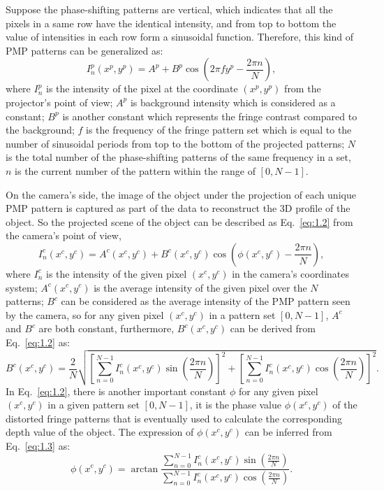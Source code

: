 \documentclass[]{spie}  %
\begin{document}
Suppose the phase-shifting patterns are vertical, which indicates that all the pixels in a same row have the identical intensity, and from top to bottom the value of intensities in each row form a sinusoidal function. Therefore, this kind of PMP patterns can be generalized as:
 \begin{equation} \label{eq:1.1}
  	I^p_n(x^p, y^p) = A^p + B^p\cos\left(2\pi f y^p - \frac{2\pi n}{N}\right),
  \end{equation}
where $I^p_n$ is the intensity of the pixel at the coordinate $(x^p, y^p)$ from the projector's point of view; $A^p$ is background intensity which is considered as a constant; $B^p$ is another constant which represents the fringe contrast compared to the background; $f$ is the frequency of the fringe pattern set which is equal to the number of sinusoidal periods from top to the bottom of the projected patterns; $N$ is the total number of the phase-shifting patterns of the same frequency in a set, $n$ is the current number of the pattern within the range of $[0, N-1]$.

On the camera's side, the image of  the object under the projection of each unique PMP pattern is captured as part of the data to reconstruct the 3D profile of the object. So the projected scene of the object can be described as Eq.~\eqref{eq:1.2} from the camera's point of view, 
 \begin{equation} \label{eq:1.2}
  	I^c_n(x^c, y^c) =  A^c(x^c, y^c) + B^c(x^c, y^c)\cos\left(\phi(x^c, y^c) - \frac{2\pi n}{N}\right),
  \end{equation}
where $I^c_n$ is the intensity of the given pixel $(x^c, y^c)$ in the camera's coordinates system; $A^c(x^c, y^c)$ is the average intensity of the given pixel over the $N$ patterns; $B^c$ can be considered as the average intensity of the PMP pattern seen by the camera, so for any given pixel $(x^c, y^c)$ in a pattern set $[0, N-1]$, $A^c$ and $B^c$ are both constant, furthermore, $B^c(x^c, y^c)$ can be derived from Eq.~\eqref{eq:1.2} as:
  \begin{equation} \label{eq:1.3}
  	B^c(x^c, y^c) = \frac{2}{N}\sqrt{\left[\sum_{n=0}^{N-1}I_n^c(x^c, y^c)\sin (\frac{2\pi n}{N})\right]^2 + \left[\sum_{n=0}^{N-1}I_n^c(x^c, y^c)\cos (\frac{2\pi n}{N})\right]^2}.
  \end{equation}
In Eq.~\ref{eq:1.2}, there is another important constant $\phi$ for any given pixel $(x^c, y^c)$ in a given pattern set $[0, N-1]$, it is the phase value $\phi (x^c, y^c)$ of the distorted fringe patterns that is eventually used to calculate the corresponding depth value of the object. The expression of $\phi (x^c, y^c)$ can be inferred from Eq.~\eqref{eq:1.3} as:
  \begin{equation} \label{eq:1.4}
  	\phi (x^c, y^c) = \arctan \frac{\sum_{n=0}^{N-1} I^c_n(x^c, y^c)\sin(\frac{2\pi n}{N})}{\sum_{n=0}^{N-1} I^c_n(x^c, y^c)\cos(\frac{2\pi n}{N})}.
  \end{equation}
\end{document}
